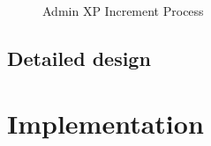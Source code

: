 \begin{landscape}
    \begin{figure}[H]
        \centering
        \caption{Admin XP Increment Process}
        \label{fig:admin-xp-increment-process}
    \end{figure}
\end{landscape}


\subsection{Detailed design}




\section{Implementation}
